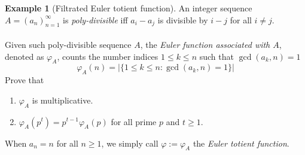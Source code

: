 \documentclass{article}
\theoremstyle{definition}
\newtheorem{example}[theorem]{Example}
\begin{document}
\begin{example}[Filtrated Euler totient function]
An integer sequence $A = (a_n)_{n = 1}^\infty$ is \emph{poly-divisible} iff $a_i - a_j$ is divisible by $i - j$ for all $i \neq j$.
\\
\\
Given such poly-divisible sequence $A$, the \emph{Euler function associated with $A$}, denoted as $\varphi_A$, counts the number indices $1 \leq k \leq n$ such that $\gcd(a_k, n) = 1$
$$\varphi_A (n) = \left| \{ 1 \leq k \leq n : \gcd(a_k, n) = 1 \} \right|$$
Prove that
	\begin{enumerate}
		\item $\varphi_A$ is multiplicative.
		\item $\varphi_A (p^t) = p^{t - 1} \varphi_A (p)$ for all prime $p$ and $t \geq 1$.
	\end{enumerate}
\end{example}
When $a_n = n$ for all $n \geq 1$, we simply call $\varphi := \varphi_A$ the \emph{Euler totient function}.
\end{document}

